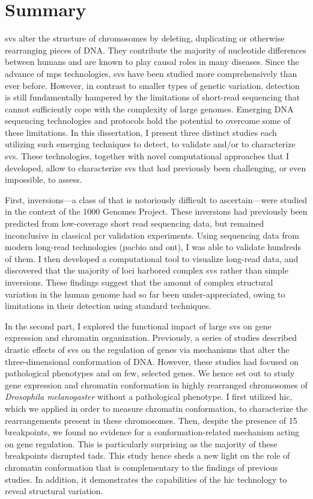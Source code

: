 \cleardoublepage
{}
\chapter*{Summary}

\Acfp{sv} alter the structure of chromosomes by deleting, duplicating or
otherwise rearranging pieces of DNA. They contribute the majority of nucleotide
differences between humans and are known to play causal roles in many diseases.
Since the advance of \acf{mps} technologies, \acp{sv} have been
studied more comprehensively than ever before. However, in contrast to smaller
types of genetic variation, \sv detection is still fundamentally hampered by
the limitations of short-read sequencing that cannot sufficiently cope with the
complexity of large genomes. Emerging DNA sequencing technologies and protocols
hold the potential to overcome some of these limitations. In this dissertation,
I present three distinct studies each utilizing such emerging techniques to
detect, to validate and/or to characterize \acp{sv}. These
technologies, together with novel computational approaches that I developed, allow
to characterize \acp{sv} that had previously been challenging, or even
impossible, to assess.

First, inversions---a class of \sv that is notoriously difficult to
ascertain---were studied in the context of the 1000 Genomes Project. These inversions had
previously been predicted from low-coverage short read sequencing data, but
remained inconclusive in classical \acs{pcr} validation experiments. Using sequencing
data from modern long-read technologies (\acl{pacbio} and \acl{ont}),
I was able to validate hundreds of them. I then developed a
computational tool to visualize long-read data, and discovered that the majority
of loci harbored complex \acp{sv} rather than simple inversions. These findings
suggest that the amount of complex structural variation in the human genome had
so far been under-appreciated, owing to limitations in their detection using
standard techniques.

In the second part, I explored the functional impact of large \acp{sv} on gene
expression and chromatin organization. Previously, a series of
studies described drastic effects of \acp{sv} on the regulation of genes
via mechanisms that alter the three-dimensional conformation of DNA. However,
these studies had focused on pathological phenotypes and on few,
selected genes. We hence set out to study
gene expression and chromatin conformation in highly rearranged
chromosomes of \textit{Drosophila melanogaster} without a pathological phenotype.
I first utilized \acs{hic}, which we applied in order to measure chromatin
conformation, to characterize the rearrangements present in these chromosomes.
Then, despite the presence of 15 breakpoints, we found no evidence for a
conformation-related mechanism acting on gene regulation. This is particularly
surprising as the majority of these breakpoints disrupted \aclp{tad}.
This study hence sheds a new light on the role of chromatin
conformation that is complementary to the findings of previous studies.
In addition, it demonstrates the capabilities of the \acs{hic} technology to
reveal structural variation.

